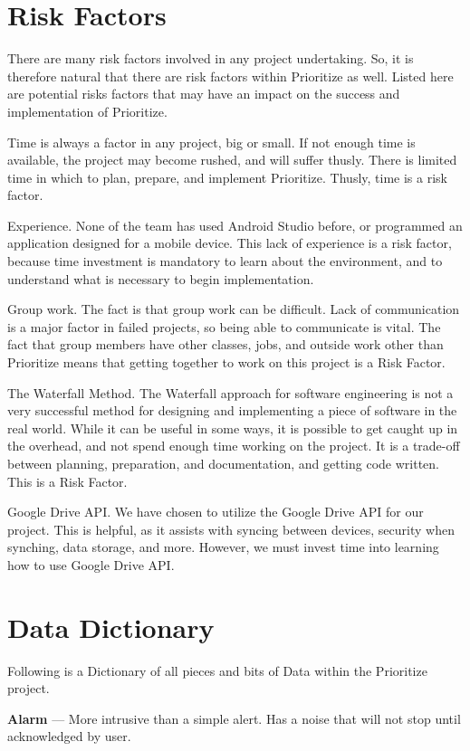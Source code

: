 \documentclass[12pt]{article}
\begin{document}
\section{Risk Factors}
There are many risk factors involved in any project undertaking. So, it is therefore natural that there are risk factors within Prioritize as well. Listed here are potential risks factors that may have an impact on the success and implementation of Prioritize.

Time is always a factor in any project, big or small. If not enough time is available, the project may become rushed, and will suffer thusly. There is limited time in which to plan, prepare, and implement Prioritize. Thusly, time is a risk factor.

Experience. None of the team has used Android Studio before, or programmed an application designed for a mobile device. This lack of experience is a risk factor, because time investment is mandatory to learn about the environment, and to understand what is necessary to begin implementation.

Group work. The fact is that group work can be difficult. Lack of communication is a major factor in failed projects, so being able to communicate is vital. The fact that group members have other classes, jobs, and outside work other than Prioritize means that getting together to work on this project is a Risk Factor. 

The Waterfall Method. The Waterfall approach for software engineering is not a very successful method for designing and implementing a piece of software in the real world. While it can be useful in some ways, it is possible to get caught up in the overhead, and not spend enough time working on the project. It is a trade-off between planning, preparation, and documentation, and getting code written. This is a Risk Factor.

Google Drive API. We have chosen to utilize the Google Drive API for our project. This is helpful, as it assists with syncing between devices, security when synching, data storage, and more. However, we must invest time into learning how to use Google Drive API. 


\section{Data Dictionary}\label{Data Dictionary}
Following is a Dictionary of all pieces and bits of Data within the Prioritize project.

\textbf{Alarm} --- More intrusive than a simple alert. Has a noise that will not stop until acknowledged by user.
\end{document}
